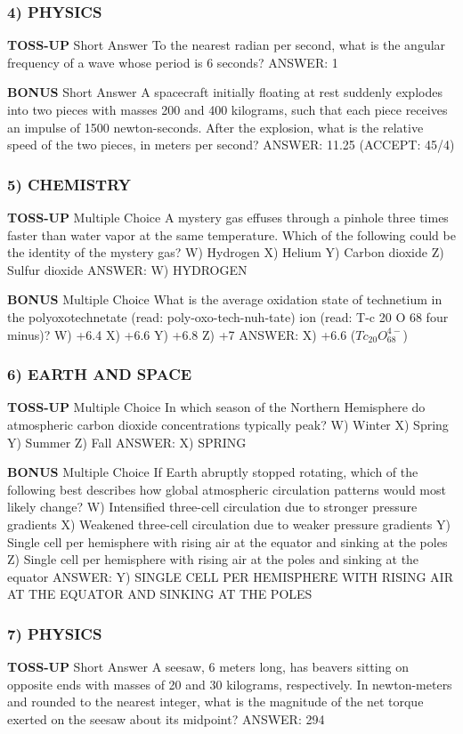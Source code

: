\documentclass{article}
\begin{document}
\subsubsection*{4) PHYSICS}
\textbf{TOSS-UP}
Short Answer To the nearest radian per second, what is the angular frequency of a wave whose period is 6 seconds?
ANSWER: 1

\textbf{BONUS}
Short Answer A spacecraft initially floating at rest suddenly explodes into two pieces with masses 200 and 400 kilograms, such that each piece receives an impulse of 1500 newton-seconds. After the explosion, what is the relative speed of the two pieces, in meters per second?
ANSWER: 11.25 (ACCEPT: 45/4)

\subsubsection*{5) CHEMISTRY}
\textbf{TOSS-UP}
Multiple Choice A mystery gas effuses through a pinhole three times faster than water vapor at the same temperature. Which of the following could be the identity of the mystery gas?
W) Hydrogen
X) Helium
Y) Carbon dioxide
Z) Sulfur dioxide
ANSWER: W) HYDROGEN

\textbf{BONUS}
Multiple Choice What is the average oxidation state of technetium in the polyoxotechnetate (read: poly-oxo-tech-nuh-tate) ion (read: T-c 20 O 68 four minus)?
W) +6.4
X) +6.6
Y) +6.8
Z) +7
ANSWER: X) +6.6 ($Tc_{20}O_{68}^{4-}$)

\subsubsection*{6) EARTH AND SPACE}
\textbf{TOSS-UP}
Multiple Choice In which season of the Northern Hemisphere do atmospheric carbon dioxide concentrations typically peak?
W) Winter
X) Spring
Y) Summer
Z) Fall
ANSWER: X) SPRING

\textbf{BONUS}
Multiple Choice If Earth abruptly stopped rotating, which of the following best describes how global atmospheric circulation patterns would most likely change?
W) Intensified three-cell circulation due to stronger pressure gradients
X) Weakened three-cell circulation due to weaker pressure gradients
Y) Single cell per hemisphere with rising air at the equator and sinking at the poles
Z) Single cell per hemisphere with rising air at the poles and sinking at the equator
ANSWER: Y) SINGLE CELL PER HEMISPHERE WITH RISING AIR AT THE EQUATOR AND SINKING AT THE POLES

\subsubsection*{7) PHYSICS}
\textbf{TOSS-UP}
Short Answer A seesaw, 6 meters long, has beavers sitting on opposite ends with masses of 20 and 30 kilograms, respectively. In newton-meters and rounded to the nearest integer, what is the magnitude of the net torque exerted on the seesaw about its midpoint?
ANSWER: 294
\end{document}
